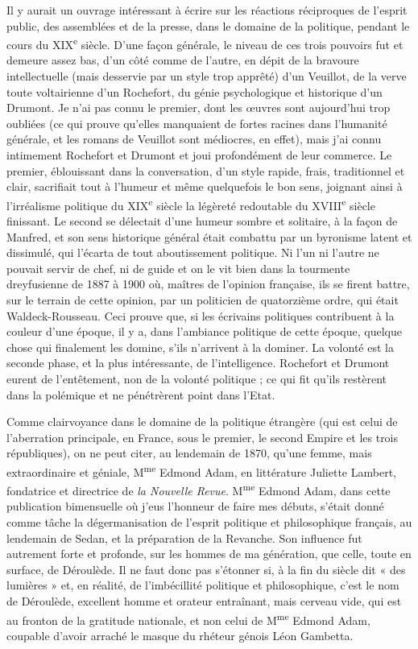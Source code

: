 \documentclass[french,twoside]{book} %
\begin{document}
Il y aurait un ouvrage intéressant à écrire sur les réactions réciproques de l’esprit public, des assemblées et de la presse, dans le domaine de la politique, pendant le cours du XIX\textsuperscript{e} siècle. D’une façon générale, le niveau de ces trois pouvoirs fut et demeure assez bas, d’un côté comme de l’autre, en dépit de la bravoure intellectuelle (mais desservie par un style trop apprêté) d’un Veuillot, de la verve toute voltairienne d’un Rochefort, du génie psychologique et historique d’un Drumont. Je n’ai pas connu le premier, dont les œuvres sont aujourd’hui trop oubliées (ce qui prouve qu’elles manquaient de fortes racines dans l’humanité générale, et les romans de Veuillot sont médiocres, en effet), mais j’ai connu intimement Rochefort et Drumont et joui profondément de leur commerce. Le premier, éblouissant dans la conversation, d’un style rapide, frais, traditionnel et clair, sacrifiait tout à l’humeur et même quelquefois le bon sens, joignant ainsi à l’irréalisme politique du XIX\textsuperscript{e} siècle la légèreté redoutable du XVIII\textsuperscript{e} siècle finissant. Le second se délectait d’une humeur sombre et solitaire, à la façon de Manfred, et son sens historique général était combattu par un byronisme latent et dissimulé, qui l’écarta de tout aboutissement politique. Ni l’un ni l’autre ne pouvait servir de chef, ni de guide et on le vit bien dans la tourmente dreyfusienne de 1887 à 1900 où, maîtres de l’opinion française, ils se firent battre, sur le terrain de cette opinion, par un politicien de quatorzième ordre, qui était Waldeck-Rousseau. Ceci prouve que, si les écrivains politiques contribuent à la couleur d’une époque, il y a, dans l’ambiance politique de cette époque, quelque chose qui finalement les domine, s’ils n’arrivent à la dominer. La volonté est la seconde phase, et la plus intéressante, de l’intelligence. Rochefort et Drumont eurent de l’entêtement, non de la volonté politique ; ce qui fit qu’ils restèrent dans la polémique et ne pénétrèrent point dans l’Etat.\par
Comme clairvoyance dans le domaine de la politique étrangère (qui est celui de l’aberration principale, en France, sous le premier, le second Empire et les trois républiques), on ne peut citer, au lendemain de 1870, qu’une femme, mais extraordinaire et géniale, M\textsuperscript{me} Edmond Adam, en littérature Juliette Lambert, fondatrice et directrice de {\itshape la Nouvelle Revue}. M\textsuperscript{me} Edmond Adam, dans cette publication bimensuelle où j’eus l’honneur de faire mes débuts, s’était donné comme tâche la dégermanisation de l’esprit politique et philosophique français, au lendemain de Sedan, et la préparation de la Revanche. Son influence fut autrement forte et profonde, sur les hommes de ma génération, que celle, toute en surface, de Déroulède. Il ne faut donc pas s’étonner si, à la fin du siècle dit « des lumières » et, en réalité, de l’imbécillité politique et philosophique, c’est le nom de Déroulède, excellent homme et orateur entraînant, mais cerveau vide, qui est au fronton de la gratitude nationale, et non celui de M\textsuperscript{me} Edmond Adam, coupable d’avoir arraché le masque du rhéteur génois Léon Gambetta.\par
\end{document}
